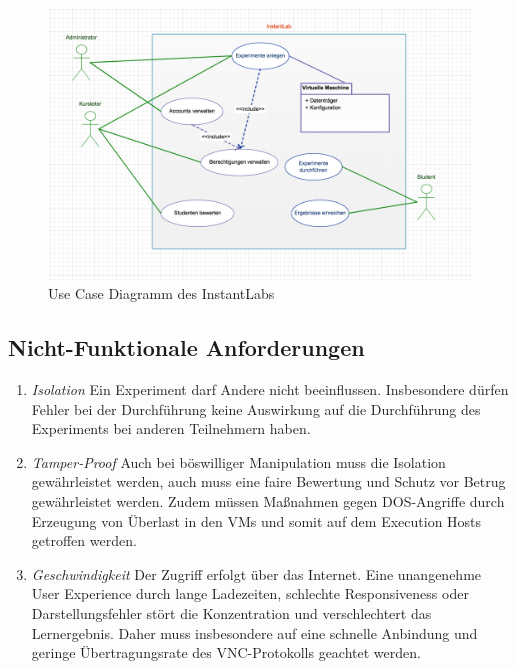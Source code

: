 			\begin{figure}[h]
				\begin{center}
					\includegraphics[width=\textwidth]{img/usecases}
					\caption{Use Case Diagramm des InstantLabs}
					\label{fig:instantlab-usecases}
				\end{center}
			\end{figure}


		\subsection{Nicht-Funktionale Anforderungen}

		\begin{enumerate}
			\item \emph{Isolation} Ein Experiment darf Andere nicht beeinflussen. Insbesondere dürfen Fehler bei der Durchführung keine Auswirkung auf die Durchführung des Experiments bei anderen Teilnehmern haben.
			\item \emph{Tamper-Proof} Auch bei böswilliger Manipulation muss die Isolation gewährleistet werden, auch muss eine faire Bewertung und Schutz vor Betrug gewährleistet werden. Zudem müssen Maßnahmen gegen DOS-Angriffe durch Erzeugung von Überlast in den VMs und somit auf dem Execution Hosts getroffen werden. 
			\item \emph{Geschwindigkeit} Der Zugriff erfolgt über das Internet. Eine unangenehme User Experience durch lange Ladezeiten, schlechte Responsiveness oder Darstellungsfehler stört die Konzentration und verschlechtert das Lernergebnis. Daher muss insbesondere auf eine schnelle Anbindung und geringe Übertragungsrate des VNC-Protokolls geachtet werden.
		\end{enumerate}
	

